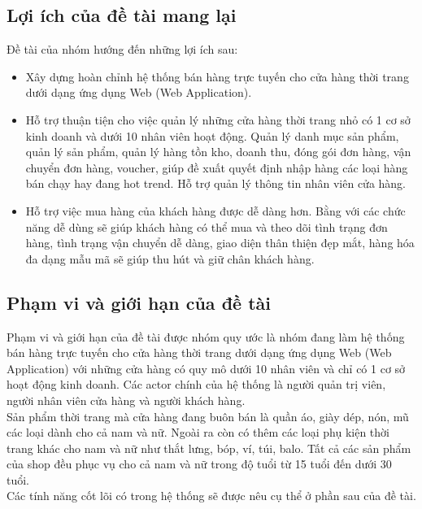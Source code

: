 \subsection{Lợi ích của đề tài mang lại}

Đề tài của nhóm hướng đến những lợi ích sau:
\begin{itemize}
  \item Xây dựng hoàn chỉnh hệ thống bán hàng trực tuyến cho cửa hàng thời trang dưới dạng ứng dụng Web (Web Application).

  \item Hỗ trợ thuận tiện cho việc quản lý những cửa hàng thời trang nhỏ có 1 cơ sở kinh doanh và dưới 10 nhân viên hoạt động. Quản lý danh mục sản phẩm, quản lý sản phẩm, quản lý hàng tồn kho, doanh thu, đóng gói đơn hàng, vận chuyển đơn hàng, voucher, giúp đề xuất quyết định nhập hàng các loại hàng bán chạy hay đang hot trend. Hỗ trợ quản lý thông tin nhân viên cửa hàng.

  \item Hỗ trợ việc mua hàng của khách hàng được dễ dàng hơn. Bằng với các chức năng dễ dùng sẽ giúp khách hàng có thể mua và theo dõi tình trạng đơn hàng, tình trạng vận chuyển dễ dàng, giao diện thân thiện đẹp mắt, hàng hóa đa dạng mẫu mã sẽ giúp thu hút và giữ chân khách hàng.

\end{itemize}
\subsection{Phạm vi và giới hạn của đề tài}

Phạm vi và giới hạn của đề tài được nhóm quy ước là nhóm đang làm hệ thống bán hàng trực tuyến cho cửa hàng thời trang dưới dạng ứng dụng Web (Web Application) với những cửa hàng có quy mô dưới 10 nhân viên và chỉ có 1 cơ sở hoạt động kinh doanh. Các actor chính của hệ thống là người quản trị viên, người nhân viên cửa hàng và người khách hàng.\\

Sản phẩm thời trang mà cửa hàng đang buôn bán là quần áo, giày dép, nón, mũ các loại dành cho cả nam và nữ. Ngoài ra còn có thêm các loại phụ kiện thời trang khác cho nam và nữ như thắt lưng, bóp, ví, túi, balo. Tất cả các sản phẩm của shop đều phục vụ cho cả nam và nữ trong độ tuổi từ 15 tuổi đến dưới 30 tuổi.\\

Các tính năng cốt lõi có trong hệ thống sẽ được nêu cụ thể ở phần sau của đề tài.

